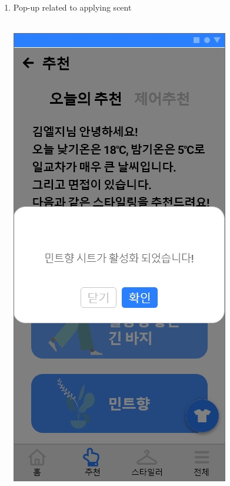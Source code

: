 \documentclass[conference]{IEEEtran}
\begin{document}
\begin{enumerate}
    \item Pop-up related to applying scent \\ \\
        \centerline{\includegraphics[scale=0.24]{assets/추천4.jpg}
}
\end{enumerate}
\end{document}
